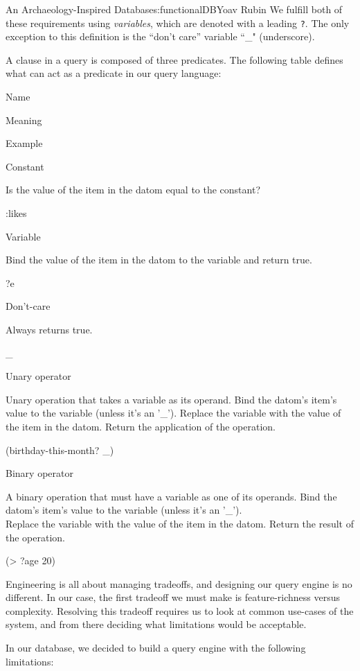 \begin{aosachapter}{An Archaeology-Inspired Database}{s:functionalDB}{Yoav Rubin}
We fulfill both of these requirements using \emph{variables}, which are
denoted with a leading \texttt{?}. The only exception to this definition
is the ``don't care'' variable ``\_" (underscore).

A clause in a query is composed of three predicates. The following table
defines what can act as a predicate in our query language:

Name

Meaning

Example

Constant

Is the value of the item in the datom equal to the constant?

:likes

Variable

Bind the value of the item in the datom to the variable and return true.

?e

Don't-care

Always returns true.

\_

Unary operator

Unary operation that takes a variable as its operand. Bind the datom's
item's value to the variable (unless it's an '\_'). Replace the variable
with the value of the item in the datom. Return the application of the
operation.

(birthday-this-month? \_)

Binary operator

A binary operation that must have a variable as one of its operands.
Bind the datom's item's value to the variable (unless it's an '\_').\\
Replace the variable with the value of the item in the datom. Return the
result of the operation.

(\textgreater{} ?age 20)

\label{limitations-of-our-query-language}

Engineering is all about managing tradeoffs, and designing our query
engine is no different. In our case, the first tradeoff we must make is
feature-richness versus complexity. Resolving this tradeoff requires us
to look at common use-cases of the system, and from there deciding what
limitations would be acceptable.

In our database, we decided to build a query engine with the following
limitations:

\begin{aosaitemize}


\end{aosaitemize}
\end{aosachapter}
